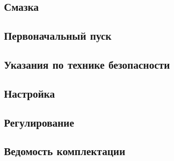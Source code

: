 \subsection{Смазка}

\subsection{Первоначальный пуск}

\subsection{Указания по технике безопасности}

\subsection{Настройка}

\subsection{Регулирование}

\subsection{Ведомость комплектации}
